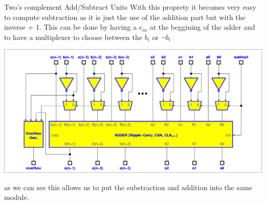 \begin{parag}{Two's complement Add/Subtract Units}
    With this proprety it becomes very easy to compute subtraction as it is just the use of the addition part but with the inverse + 1. This can be done by having a $c_{in}$ at the beggining of the adder and to have a multiplexer to choose between the $b_i$ or $\neg b_i$
	\begin{center}
	\includegraphics[scale=0.2]{screenshots/2025-10-21_3.png}
	\end{center}
	as we can see this allows us to put the substraction and addition into the same module.
\end{parag}







